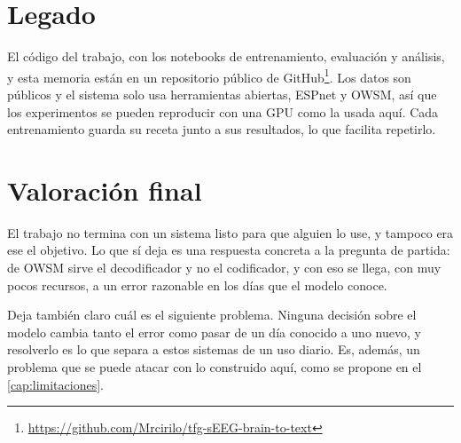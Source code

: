 \section{Legado}

El código del trabajo, con los notebooks de entrenamiento, evaluación y análisis, y esta memoria están en un repositorio público de GitHub\footnote{\url{https://github.com/Mrcirilo/tfg-sEEG-brain-to-text}}. Los datos son públicos \cite{b2t25} y el sistema solo usa herramientas abiertas, ESPnet y OWSM, así que los experimentos se pueden reproducir con una GPU como la usada aquí. Cada entrenamiento guarda su receta junto a sus resultados, lo que facilita repetirlo.

\section{Valoración final}

El trabajo no termina con un sistema listo para que alguien lo use, y tampoco era ese el objetivo. Lo que sí deja es una respuesta concreta a la pregunta de partida: de OWSM sirve el decodificador y no el codificador, y con eso se llega, con muy pocos recursos, a un error razonable en los días que el modelo conoce.

Deja también claro cuál es el siguiente problema. Ninguna decisión sobre el modelo cambia tanto el error como pasar de un día conocido a uno nuevo, y resolverlo es lo que separa a estos sistemas de un uso diario. Es, además, un problema que se puede atacar con lo construido aquí, como se propone en el \cref{cap:limitaciones}.
